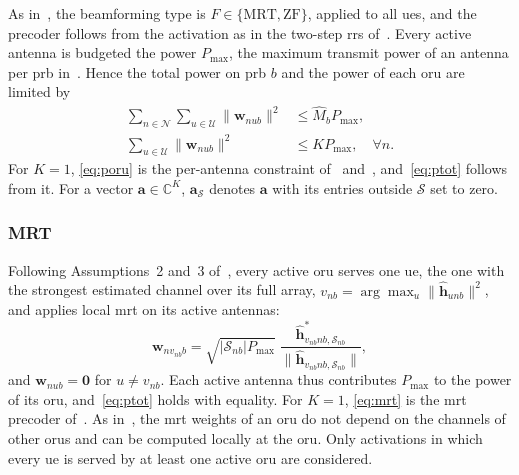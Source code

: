 \documentclass[10pt, final, journal, letterpaper, twocolumn]{IEEEtran}
\newcommand{\Nset}{\mathcal{N}}
\newcommand{\Uset}{\mathcal{U}}
\newcommand{\Pmax}{P_{\max}}
\newcommand{\bhh}{\hat{\mathbf{h}}}
\newcommand{\bw}{\mathbf{w}}
\begin{document}
As in~\cite{girycki2024eucnc}, the beamforming type is $F \in \{\mathrm{MRT}, \mathrm{ZF}\}$, applied to all \glspl{ue}, and the precoder follows from the activation as in the two-step \gls{rrs} of~\cite{girycki2024twc}. Every active antenna is budgeted the power $\Pmax$, the maximum transmit power of an antenna per \gls{prb} in~\cite[eq.~(8)]{girycki2024eucnc}. Hence the total power on \gls{prb} $b$ and the power of each \gls{oru} are limited by
\begin{align}
  \sum_{n \in \Nset} \sum_{u \in \Uset} \|\bw_{nub}\|^2 &\le \hat{M}_b \Pmax, \label{eq:ptot}\\
  \sum_{u \in \Uset} \|\bw_{nub}\|^2 &\le K \Pmax, \quad \forall n. \label{eq:poru}
\end{align}
For $K = 1$, \eqref{eq:poru} is the per-antenna constraint of~\cite[eq.~(8)]{girycki2024eucnc} and~\cite[eq.~(10)]{girycki2024twc}, and~\eqref{eq:ptot} follows from it. For a vector $\mathbf{a} \in \mathbb{C}^K$, $\mathbf{a}_{\mathcal{S}}$ denotes $\mathbf{a}$ with its entries outside $\mathcal{S}$ set to zero.

\subsubsection{MRT}
Following Assumptions~2 and~3 of~\cite{girycki2024twc}, every active \gls{oru} serves one \gls{ue}, the one with the strongest estimated channel over its full array, $v_{nb} = \arg\max_{u} \|\bhh_{unb}\|^2$, and applies local \gls{mrt} on its active antennas:
\begin{equation}
  \bw_{n v_{nb} b} = \sqrt{|\mathcal{S}_{nb}| \Pmax}\; \frac{\bhh_{v_{nb} n b, \mathcal{S}_{nb}}^{*}}{\big\|\bhh_{v_{nb} n b, \mathcal{S}_{nb}}\big\|},
  \label{eq:mrt}
\end{equation}
and $\bw_{nub} = \mathbf{0}$ for $u \neq v_{nb}$.
Each active antenna thus contributes $\Pmax$ to the power of its \gls{oru}, and~\eqref{eq:ptot} holds with equality. For $K = 1$, \eqref{eq:mrt} is the \gls{mrt} precoder of~\cite[eqs.~(13), (14)]{girycki2024twc}. As in~\cite{girycki2024eucnc}, the \gls{mrt} weights of an \gls{oru} do not depend on the channels of other \glspl{oru} and can be computed locally at the \gls{oru}. Only activations in which every \gls{ue} is served by at least one active \gls{oru} are considered.
\end{document}
